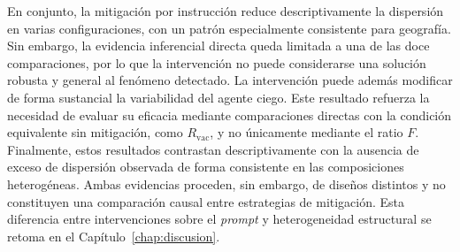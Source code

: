 En conjunto, la mitigación por instrucción reduce descriptivamente la dispersión en varias configuraciones, con un patrón especialmente consistente para geografía. Sin embargo, la evidencia inferencial directa queda limitada a una de las doce comparaciones, por lo que la intervención no puede considerarse una solución robusta y general al fenómeno detectado. La intervención puede además modificar de forma sustancial la variabilidad del agente ciego. Este resultado refuerza la necesidad de evaluar su eficacia mediante comparaciones directas con la condición equivalente sin mitigación, como $R_{\mathrm{vac}}$, y no únicamente mediante el ratio $F$. Finalmente, estos resultados contrastan descriptivamente con la ausencia de exceso de dispersión observada de forma consistente en las composiciones heterogéneas. Ambas evidencias proceden, sin embargo, de diseños distintos y no constituyen una comparación causal entre estrategias de mitigación. Esta diferencia entre intervenciones sobre el \textit{prompt} y heterogeneidad estructural se retoma en el Capítulo~\ref{chap:discusion}.